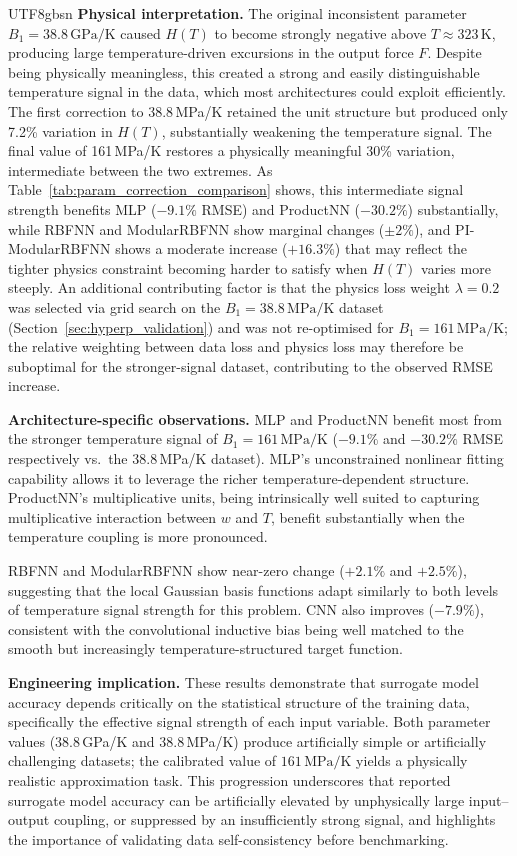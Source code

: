 \documentclass[a4paper,12pt]{report}
\begin{document}
\begin{CJK}{UTF8}{gbsn}
\textbf{Physical interpretation.}
The original inconsistent parameter $B_1 = 38.8\,\text{GPa/K}$ caused $H(T)$ to become
strongly negative above $T \approx 323\,\text{K}$, producing large temperature-driven
excursions in the output force $F$. Despite being physically meaningless, this created a
strong and easily distinguishable temperature signal in the data, which most architectures
could exploit efficiently. The first correction to 38.8\,MPa/K retained the unit structure
but produced only 7.2\% variation in $H(T)$, substantially weakening the temperature signal.
The final value of 161\,MPa/K restores a physically meaningful 30\% variation, intermediate
between the two extremes. As Table~\ref{tab:param_correction_comparison} shows, this
intermediate signal strength benefits MLP ($-9.1\%$ RMSE) and ProductNN ($-30.2\%$)
substantially, while RBFNN and ModularRBFNN show marginal changes ($\pm 2\%$), and
PI-ModularRBFNN shows a moderate increase ($+16.3\%$) that may reflect the tighter
physics constraint becoming harder to satisfy when $H(T)$ varies more steeply.
An additional contributing factor is that the physics loss weight $\lambda = 0.2$
was selected via grid search on the $B_1 = 38.8\,\mathrm{MPa/K}$ dataset
(Section~\ref{sec:hyperp_validation}) and was not re-optimised for
$B_1 = 161\,\mathrm{MPa/K}$; the relative weighting between data loss and physics
loss may therefore be suboptimal for the stronger-signal dataset, contributing to
the observed RMSE increase.

\textbf{Architecture-specific observations.}
MLP and ProductNN benefit most from the stronger temperature signal of
$B_1 = 161\,\mathrm{MPa/K}$ ($-9.1\%$ and $-30.2\%$ RMSE respectively vs.\ the
38.8\,MPa/K dataset). MLP's unconstrained nonlinear fitting capability allows it to
leverage the richer temperature-dependent structure. ProductNN's multiplicative units,
being intrinsically well suited to capturing multiplicative interaction between $w$ and
$T$, benefit substantially when the temperature coupling is more pronounced.

RBFNN and ModularRBFNN show near-zero change ($+2.1\%$ and $+2.5\%$), suggesting that
the local Gaussian basis functions adapt similarly to both levels of temperature signal
strength for this problem. CNN also improves ($-7.9\%$), consistent with the
convolutional inductive bias being well matched to the smooth but increasingly
temperature-structured target function.

\textbf{Engineering implication.}
These results demonstrate that surrogate model accuracy depends critically on the
statistical structure of the training data, specifically the effective signal strength
of each input variable. Both parameter values (38.8\,GPa/K and 38.8\,MPa/K) produce
artificially simple or artificially challenging datasets; the calibrated value of
$161\,\mathrm{MPa/K}$ yields a physically realistic approximation task. This progression
underscores that reported surrogate model accuracy can be artificially elevated by
unphysically large input--output coupling, or suppressed by an insufficiently strong
signal, and highlights the importance of validating data self-consistency before benchmarking.



\end{CJK}
\end{document}
